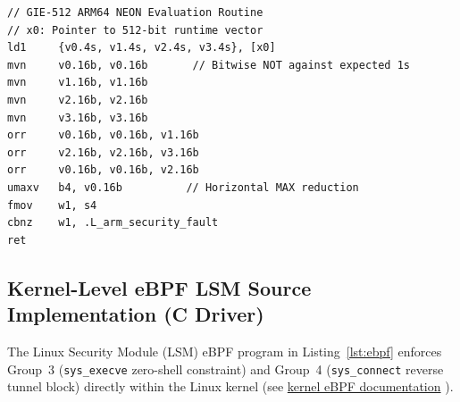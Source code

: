 \documentclass{portalciencia}
\newcommand{\linkebpf}{%
  \href{https://docs.kernel.org/bpf/}{kernel eBPF documentation}%
}
\theoremstyle{plain}
\theoremstyle{definition}
\begin{document}
\begin{lstlisting}[caption={GIE-512 ARM64 NEON evaluation routine.}, label={lst:neon}]
// GIE-512 ARM64 NEON Evaluation Routine
// x0: Pointer to 512-bit runtime vector
ld1     {v0.4s, v1.4s, v2.4s, v3.4s}, [x0]
mvn     v0.16b, v0.16b       // Bitwise NOT against expected 1s
mvn     v1.16b, v1.16b
mvn     v2.16b, v2.16b
mvn     v3.16b, v3.16b
orr     v0.16b, v0.16b, v1.16b
orr     v2.16b, v2.16b, v3.16b
orr     v0.16b, v0.16b, v2.16b
umaxv   b4, v0.16b          // Horizontal MAX reduction
fmov    w1, s4
cbnz    w1, .L_arm_security_fault
ret
\end{lstlisting}

\subsection{Kernel-Level eBPF LSM Source Implementation (C Driver)}

The Linux Security Module (LSM) eBPF program in Listing~\ref{lst:ebpf} enforces Group~3 (\texttt{sys\_execve} zero-shell constraint) and Group~4 (\texttt{sys\_connect} reverse tunnel block) directly within the Linux kernel (see \linkebpf).
\end{document}
